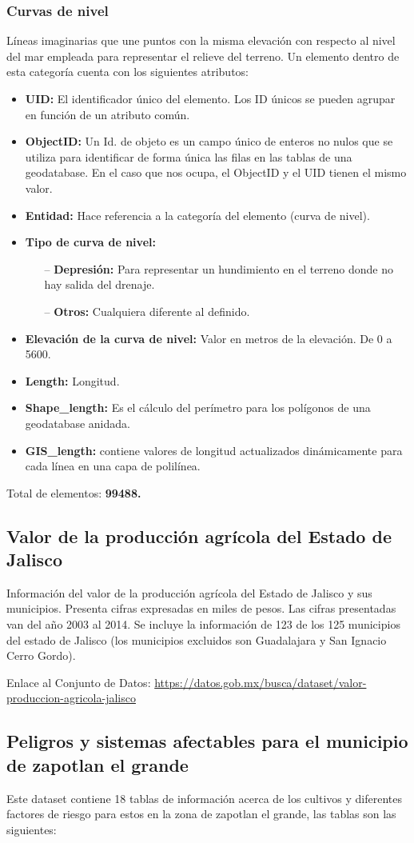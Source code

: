 \documentclass[10pt,letterpaper]{article}
\newcommand{\descripcion}{Un elemento dentro de esta categor\'ia cuenta con los siguientes atributos:}
\newcommand{\total}{Total de elementos: }
\newcommand{\UID}{\textbf{UID:} El identificador \'unico del elemento. Los ID \'unicos se pueden agrupar en funci\'on de un atributo com\'un.}
\newcommand{\OID}{\textbf{ObjectID:} Un Id. de objeto es un campo \'unico de enteros no nulos que se utiliza para identificar de forma \'unica las filas en las tablas de una geodatabase. En el caso que nos ocupa, el ObjectID y el UID tienen el mismo valor.}
\newcommand{\ent}{\textbf{Entidad:} Hace referencia a la categor\'ia del elemento }
\newcommand{\SHL}{\textbf{Shape\_length:} Es el c\'alculo del per\'imetro para los pol\'igonos de una geodatabase anidada.}
\newcommand{\GISL}{\textbf{GIS\_length:} contiene valores de longitud actualizados din\'amicamente para cada l\'inea en una capa de polil\'inea.}
\begin{document}
\subsubsection{Curvas de nivel}
L\'ineas imaginarias que une puntos con la misma elevaci\'on con respecto al nivel del mar empleada para representar el relieve del terreno. \descripcion
\begin{itemize}
	\item \UID
	\item \OID
	\item \ent (curva de nivel).
	\item \textbf{Tipo de curva de nivel:}
	\begin{itemize}
		\item[--] \textbf{Depresi\'on:} Para representar un hundimiento en el terreno donde no hay salida del drenaje.
		\item[--] \textbf{Otros:} Cualquiera diferente al definido.
	\end{itemize}
	\item \textbf{Elevaci\'on de la curva de nivel:} Valor en metros de la elevaci\'on. De 0 a 5600.
	\item \textbf{Length:} Longitud.
	\item \SHL
	\item \GISL
\end{itemize}
\total \textbf{99488.}

\subsection{Valor de la producci\'on agr\'icola del Estado de Jalisco}

Informaci\'on del valor de la producci\'on agr\'icola del Estado de Jalisco y sus municipios. Presenta cifras expresadas en miles de pesos. Las cifras presentadas van del a\~no 2003 al 2014. Se incluye la informaci\'on de 123 de los 125 municipios del estado de Jalisco (los municipios excluidos son Guadalajara y San Ignacio Cerro Gordo).

Enlace al Conjunto de Datos:
\url{https://datos.gob.mx/busca/dataset/valor-produccion-agricola-jalisco}

\subsection{Peligros y sistemas afectables para el municipio de zapotlan el grande}
Este dataset contiene 18 tablas de información acerca de los cultivos y diferentes factores de riesgo para estos en la zona de zapotlan el grande, las tablas son las siguientes:  \\
\end{document}
